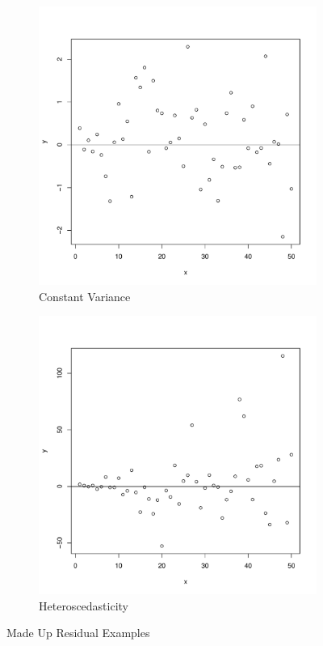 \documentclass[11pt,openany]{book}\usepackage[]{graphicx}\usepackage[]{color}
\begin{document}
\begin{figure}
        \centering
        \begin{subfigure}[b]{0.45\textwidth}
                \centering
                \includegraphics[width=\textwidth]{15_Diagnostics/convar.pdf}%
                \caption{Constant Variance \label{fig:convar15}}
        \end{subfigure}
        \begin{subfigure}[b]{0.45\textwidth}
                \centering
                \includegraphics[width=\textwidth]{15_Diagnostics/heterovar.pdf}%
                \caption{Heteroscedasticity \label{fig:hetero15}}
        \end{subfigure}
        \caption{Made Up Residual Examples}
\end{figure}  
\end{document}
